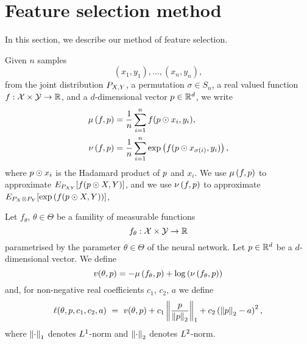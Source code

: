 \section{Feature selection method}
In this section,
we describe
our method of feature selection.

Given $n$ samples
\begin{equation*}
	(x_1, y_1), 
	\dots,
	(x_n, y_n), 
\end{equation*}
from the joint distribution $\Prob_{X, Y}$, 
a permutation $\sigma \in S_n$,
a real valued function $f: \spaceX \times \spaceY \rightarrow \R$,
and
a $d$-dimensional vector $\projection \in \Rd$,
we write
\begin{equation}
	\begin{split}
		\jointeval[f, \projection] &= \frac{1}{n} \sum_{i=1}^{n} f(\projection \hadamard x_i, y_i),
		\\
		\prodeval[f, \projection] &= \frac{1}{n} \sum_{i=1}^{n} \exp\left(f(\projection \hadamard x_{\sigma(i)}, y_i)\right),
	\end{split}
\end{equation}
where
$\projection \hadamard x_i$ 
is the Hadamard product of 
$\projection$ and $x_i$. 
We use 
$\jointeval[f, \projection]$ 
to approximate 
$\Expectation_{\Prob_{XY}}[f(\projection \hadamard X, Y)]$,
and we use
$\prodeval[f, \projection]$ 
to approximate 
$\Expectation_{\Prob_{X} \otimes \Prob_{Y}}[\exp\left(f(\projection \hadamard X, Y)\right)]$,

Let 
$f_\theta$, $\theta \in \Theta$
be a famility of measurable functions
\begin{equation*}
	f_\theta: \spaceX \times \spaceY \rightarrow \R
\end{equation*}
parametrised by the parameter $\theta \in \Theta$ of the neural network.
Let 
$\projection \in \Rd$
be a $d$-dimensional vector. 
We define
\begin{equation}
	\donskervaradhanloss(\theta, \projection) = - \jointeval[f_\theta, \projection] + \log \left(\prodeval[f_\theta, \projection]\right)
\end{equation}
and, 
for 
non-negative real coefficients $c_1$, $c_2$, $a$
we define
\begin{equation}
	\lossfun(\theta, p, c_1, c_2, a)
 \,\,
	=  
 \,\,
	\donskervaradhanloss(\theta, \projection)
		 + 
		c_1 \lonenorm[\frac{\projection}{\ltwonorm[\projection]}]
		 + 
		c_2 \left( \ltwonorm[\projection] - a \right)\squared,
\end{equation}
where 
$\lonenorm$ denotes $\Lone$-norm 
and 
$\ltwonorm$ denotes $\Ltwo$-norm.


